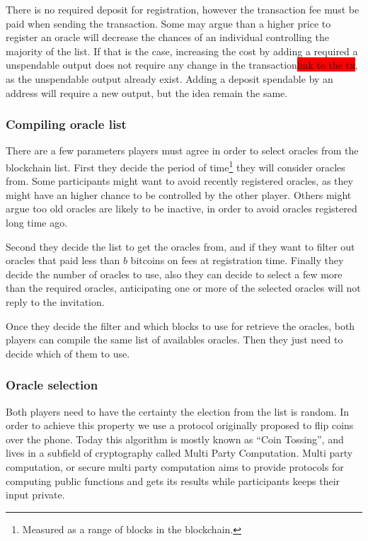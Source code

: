 There is no required deposit for registration, however the transaction fee must
  be paid when sending the transaction.
Some may argue than a higher price to register an oracle will decrease the
  chances of an individual controlling the majority of the list.
If that is the case, increasing the cost by adding a required a unspendable
  output does not require any change in the transaction\colorbox{red}{link to the tx}, as the unspendable
  output already exist. Adding a deposit spendable by an address will require
  a new output, but the idea remain the same.

\subsubsection{Compiling oracle list}

There are a few parameters players must agree in order to select oracles from
  the blockchain list.
First they decide the period of time\footnote{Measured as a range of blocks in
  the blockchain.} they will consider oracles from.
Some participants might want to avoid recently registered oracles, as they might
  have an higher chance to be controlled by the other player.
Others might argue too old oracles are likely to be inactive, in order to avoid
  oracles registered long time ago.

Second they decide the list to get the oracles from, and if they want to filter
  out oracles that paid less than $b$ bitcoins on fees at registration time.
Finally they decide the number of oracles to use, also they can decide to
  select a few more than the required oracles, anticipating one or more of
  the selected oracles will not reply to the invitation.

Once they decide the filter and which blocks to use for retrieve the oracles,
  both players can compile the same list of availables oracles. Then they just
  need to decide which of them to use.

\subsubsection{Oracle selection}

Both players need to have the certainty the election from the list is random.
In order to achieve this property we use a protocol originally proposed to flip
  coins over the phone\cite{blum1983coin}.
Today this algorithm is mostly known as ``Coin Tossing'', and lives in a
  subfield of cryptography called Multi Party Computation.
Multi party computation, or secure multi party computation aims to provide
  protocols for computing public functions and gets its results while
  participants keeps their input private.

